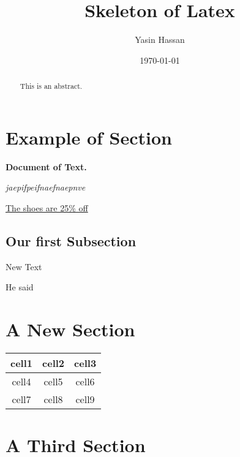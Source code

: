 \documentclass{article}
\title{Skeleton of Latex}
\author{Yasin Hassan}
\date{\today}
\begin{document}
\maketitle

\tableofcontents
\section{Example of Section}
\textbf{Document of Text.} \par \textit{jaepifpeifnaefnaepnve}

\blindtext \newline \underline{The shoes are 25\% off}
\subsection*{Our first Subsection}
New Text

He said 

\section*{A New Section}

\begin{comment}
acqecqeqeqecqe
\end{comment}

\begin{abstract}
    This is an abstract.
\end{abstract}

\begin{center}
\begin{tabular}{|c|c|c|}
    \hline
    cell1 & cell2 & cell3 \\
    \hline
    cell4 & cell5 & cell6 \\
    \hline
    cell7 & cell8 & cell9 \\
    \hline
\end{tabular}
\end{center}

\begin{comment}
\begin{table}[b!]
    \centering
    \begin{tabular}{c|c}
        c & t \\
        e & d
    \end{tabular}
    \caption{Letter Table}
    \label{tab:my_label}
\end{table}
\end{comment}

\section{A Third Section}
\blindtext
\end{document}

